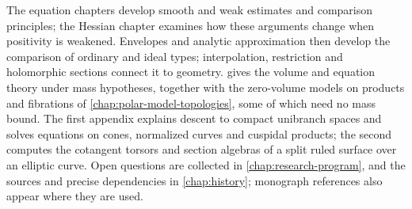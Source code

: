 The equation chapters develop smooth and weak estimates and comparison principles; the Hessian chapter examines how these arguments change when positivity is weakened. Envelopes and analytic approximation then develop the comparison of ordinary and ideal types; interpolation, restriction and holomorphic sections connect it to geometry.  gives the volume and equation theory under mass hypotheses, together with the zero-volume models on products and fibrations of \cref{chap:polar-model-topologies}, some of which need no mass bound. The first appendix explains descent to compact unibranch spaces and solves equations on cones, normalized curves and cuspidal products; the second computes the cotangent torsors and section algebras of a split ruled surface over an elliptic curve. Open questions are collected in \cref{chap:research-program}, and the sources and precise dependencies in \cref{chap:history}; monograph references also appear where they are used.
